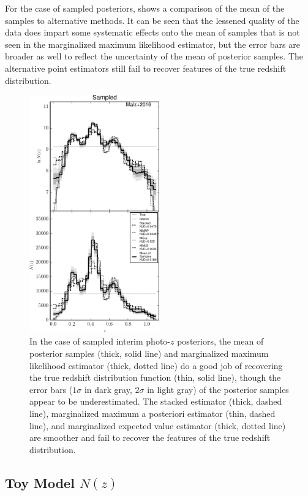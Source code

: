 For the case of sampled posteriors,  shows a comparison of the mean of the samples to alternative methods.  
It can be seen that the lessened quality of the data does impart some systematic effects onto the mean of samples that is not seen in the marginalized maximum likelihood estimator, but the error bars are broader as well to reflect the uncertainty of the mean of posterior samples.  
The alternative point estimators still fail to recover features of the true redshift distribution.

\begin{figure}
	\includegraphics[width=0.5\textwidth]{figures/chippr/samp_comps.pdf}
	\caption{In the case of sampled interim photo-$z$ posteriors, the mean of posterior samples (thick, solid line) and marginalized maximum likelihood estimator (thick, dotted line) do a good job of recovering the true redshift distribution function (thin, solid line), though the error bars ($1\sigma$ in dark gray, $2\sigma$ in light gray) of the posterior samples appear to be underestimated.  
		The stacked estimator (thick, dashed line), marginalized maximum a posteriori estimator (thin, dashed line), and marginalized expected value estimator (thick, dotted line) are smoother and fail to recover the features of the true redshift distribution.}
\end{figure}

\subsection{Toy Model $N(z)$}

